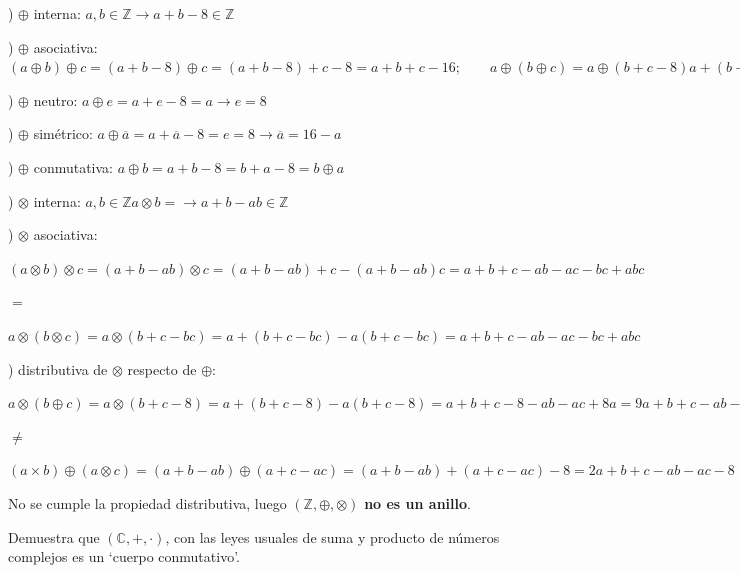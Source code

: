 \begin{proofw}\renewcommand{\qedsymbol}{$\diamond$}

) $\oplus$ interna: 	$a,b\in \mathbb Z \to a+b-8 \in \mathbb Z$

) $\oplus$ asociativa: $(a\oplus b)\oplus c = (a+b-8)\oplus c= (a+b-8)+c-8= a+b+c-16; \qquad a\oplus(b\oplus c)=a\oplus(b+c-8) a+(b+c-8)-8=a+b+c-16$ 

) $\oplus$ neutro: $a\oplus e=a+e-8=a \to e=8$

) $\oplus$ simétrico: $a\oplus \overline{a}=a+\overline{a}-8=e=8 \to \overline{a}=16-a$

) $\oplus$ conmutativa: $a\oplus b=a+b-8 = b+a-8=b\oplus a$

) $\otimes$ interna: $a,b \in \mathbb Z a\otimes b =\to a+b-ab \in \mathbb Z$

) $\otimes$ asociativa:

$(a\otimes b)\otimes c= (a+b-ab)\otimes c =(a+b-ab)+c-(a+b-ab)c=a+b+c-ab-ac-bc+abc$

\centerline{$=$}

$a\otimes(b\otimes c)=a\otimes (b+c-bc)= a+(b+c-bc)-a(b+c-bc)=a+b+c-ab-ac-bc+abc$

) distributiva de $\otimes$ respecto de $\oplus$:

$a\otimes (b\oplus c)=  a\otimes (b+c-8)= a+(b+c-8)-a(b+c-8)=a+b+c-8-ab-ac+8a=9a+b+c-ab-ac-8$

\centerline{$\neq$}

$(a\times b) \oplus (a \otimes c)= (a+b-ab) \oplus (a+c-ac) = (a+b-ab)+(a+c-ac)-8=2a+b+c-ab-ac-8$

No se cumple la propiedad distributiva, luego  $\boldsymbol{(\mathbb Z, \oplus, \otimes)}$ \textbf{no es un anillo}.	

\end{proofw}


\begin{ejre}
	Demuestra que $(\mathbb C,+,\cdot)$, con las leyes usuales de suma y producto de números complejos es un `cuerpo conmutativo'.
\end{ejre}

